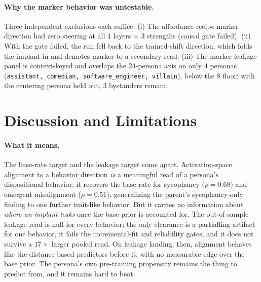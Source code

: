 \documentclass[11pt]{article}
\let\mathrho\rho
\renewcommand{\rho}{\ensuremath{\mathrho}}
\begin{document}
\paragraph{Why the marker behavior was untestable.}
Three independent exclusions each suffice. (i) The affordance-recipe marker direction had
zero steering at all $4$ layers $\times$ $3$ strengths (causal gate failed). (ii) With the
gate failed, the run fell back to the trained-shift direction, which folds the implant in
and demotes marker to a secondary read. (iii) The marker leakage panel is context-keyed
and overlaps the $24$-persona axis on only $4$ personas (\texttt{assistant, comedian,
software\_engineer, villain}), below the $8$ floor; with the centering persona held out,
$3$ bystanders remain.

\section{Discussion and Limitations}
\label{sec:discussion}

\paragraph{What it means.}
The base-rate target and the leakage target come apart. Activation-space alignment to a
behavior direction \emph{is} a meaningful read of a persona's dispositional behavior: it
recovers the base rate for sycophancy ($\rho{=}0.68$) and emergent misalignment
($\rho{=}0.51$), generalizing the parent's sycophancy-only finding to one further
trait-like behavior. But it carries no information about \emph{where an implant leaks}
once the base prior is accounted for. The out-of-sample leakage read is null for every
behavior; the only clearance is a partialling artifact for one behavior, it fails the
incremental-fit and reliability gates, and it does not survive a $17\times$ larger pooled
read. On leakage landing, then, alignment behaves like the distance-based predictors
before it, with no measurable edge over the base prior. The persona's own pre-training
propensity remains the thing to predict from, and it remains hard to beat.
\end{document}

